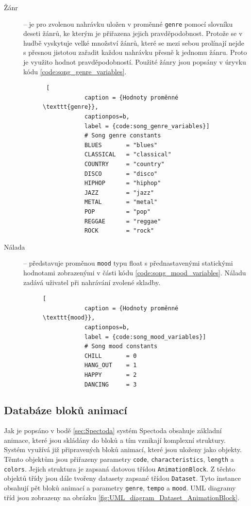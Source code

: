 \begin{description}
    \item[Žánr] -- je pro zvolenou nahrávku uložen v proměnné \texttt{genre} pomocí slovníku deseti žánrů, ke kterým je přiřazena jejich pravděpodobnost. Protože se v hudbě vyskytuje velké množství žánrů, které se mezi sebou prolínají nejde s přesnou jistotou zařadit každou nahrávku přesně k jednomu žánru. Proto je využito hodnot pravděpodobností. Použité žánry jsou popsány v úryvku kódu \ref{code:song_genre_variables}.
    \begin{figure}[H]
        \begin{lstlisting} [
            caption = {Hodnoty proměnné \texttt{genre}},
            captionpos=b,
            label = {code:song_genre_variables}]
            # Song genre constants
            BLUES       = "blues"
            CLASSICAL   = "classical"
            COUNTRY     = "country"
            DISCO       = "disco"
            HIPHOP      = "hiphop"
            JAZZ        = "jazz"
            METAL       = "metal"
            POP         = "pop"
            REGGAE      = "reggae"
            ROCK        = "rock"
        \end{lstlisting}
    \end{figure}

    \item[Nálada] -- představuje proměnou \texttt{mood} typu float s přednastavenými statickými hodnotami zobrazenými v části kódu \ref{code:song_mood_variables}. Náladu zadává uživatel při nahrávání zvolené skladby.  
    \begin{figure}[H]        
        \begin{lstlisting}[
            caption = {Hodnoty proměnné \texttt{mood}},
            captionpos=b,
            label = {code:song_mood_variables}]
            # Song mood constants
            CHILL       = 0
            HANG_OUT    = 1
            HAPPY       = 2
            DANCING     = 3
        \end{lstlisting}
    \end{figure}
    
\end{description}

\subsection{Databáze bloků animací} \label{sec:Database_structure}
Jak je popsáno v bodě \ref{sec:Spectoda} systém Spectoda obsahuje základní animace, které jsou skládány do bloků a tím vznikají komplexní struktury. Systém využívá již připravených bloků animací, které jsou uloženy jako objekty. Těmto objektům jsou přiřazeny parametry \texttt{code}, \texttt{characteristics}, \texttt{length} a \texttt{colors}. Jejich struktura je zapsaná datovou třídou \texttt{AnimationBlock}. Z těchto objektů třídy jsou dále tvořeny datasety zapsané třídou \texttt{Dataset}. Tyto instance obsahují pět bloků animací a parametry \texttt{genre}, \texttt{tempo} a \texttt{mood}. UML diagramy tříd jsou zobrazeny na obrázku \ref{fig:UML_diagram_Dataset_AnimationBlock}.

